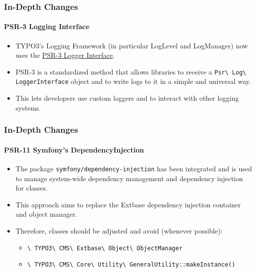 
\begin{frame}[fragile]
	\frametitle{In-Depth Changes}
	\framesubtitle{PSR-3 Logging Interface}

	\begin{itemize}
		\item TYPO3's Logging Framework (in particular LogLevel and LogManager) now uses the
			\href{https://www.php-fig.org/psr/psr-3/}{PSR-3 Logger Interface}.

		\item PSR-3 is a standardized method that allows libraries to receive a
			\texttt{Psr\textbackslash
				Log\textbackslash
				LoggerInterface} object and to write logs to it in a simple and universal way.

			\item This lets developers use custom loggers and to interact with other
				logging systems.

	\end{itemize}

\end{frame}


\begin{frame}[fragile]
	\frametitle{In-Depth Changes}
	\framesubtitle{PSR-11 Symfony's DependencyInjection}

	\begin{itemize}
		\item The package \texttt{symfony/dependency-injection} has been integrated
			and is used to manage system-wide dependency management and dependency
			injection for classes.

		\item This approach aims to replace the Extbase dependency injection
			container and object manager.

		\item Therefore, classes should be adjusted and avoid (whenever possible):

			\begin{itemize}\small
				\item \texttt{\textbackslash
					TYPO3\textbackslash
					CMS\textbackslash
					Extbase\textbackslash
					Object\textbackslash
					ObjectManager}
				\item \texttt{\textbackslash
					TYPO3\textbackslash
					CMS\textbackslash
					Core\textbackslash
					Utility\textbackslash
					GeneralUtility::makeInstance()}
			\end{itemize}\normalsize

	\end{itemize}

\end{frame}

